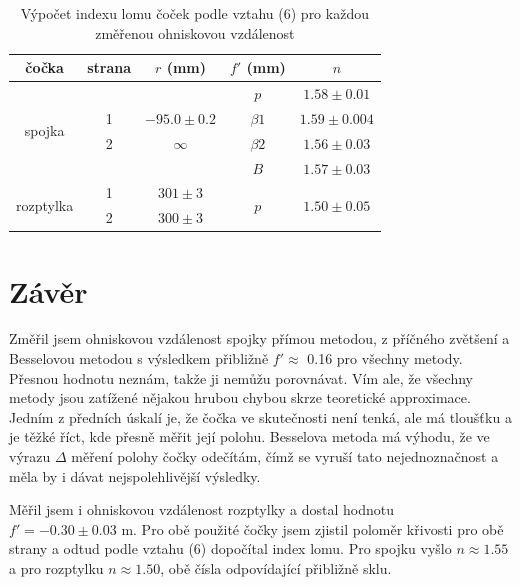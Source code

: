 \documentclass[a4paper,11pt]{article}
\begin{document}
\vspace{-10pt}

\begin{table}[htpb]
    \centering
    \begin{tabular}{c|cccc}
        \hline\hline
        čočka & strana & $ r $ (mm) & $ f' $ (mm) & $ n $ \\\hline
        \multirow{4}{*}{spojka} & &  & $ p $ & $ 1.58 \pm 0.01$ \\
         & 1 & $-95.0 \pm 0.2$ & $ \beta 1 $ & $ 1.59 \pm 0.004$ \\
         & 2 & $ \infty $ & $ \beta 2 $ &      $ 1.56 \pm 0.03$ \\
         & & & $ B $ &                   $ 1.57 \pm 0.03$ \\\hline
        \multirow{2}{*}{rozptylka} & 1 & $301 \pm 3$ & \multirow{2}{*}{$ p $} & \multirow{2}{*}{$1.50 \pm 0.05$} \\
         & 2 & $300 \pm 3$ & & \\
        \hline\hline
    \end{tabular}
    \caption{Výpočet indexu lomu čoček podle vztahu (6) pro každou změřenou ohniskovou vzdálenost}
\end{table}

\section{Závěr}

Změřil jsem ohniskovou vzdálenost spojky přímou metodou, z příčného zvětšení a Besselovou metodou s výsledkem přibližně $ f' \approx $ 0.16 pro všechny metody. Přesnou hodnotu neznám, takže ji nemůžu porovnávat. Vím ale, že všechny metody jsou zatížené nějakou hrubou chybou skrze teoretické approximace. Jedním z předních úskalí je, že čočka ve skutečnosti není tenká, ale má tloušťku a je těžké říct, kde přesně měřit její polohu. Besselova metoda má výhodu, že ve výrazu $ \Delta $ měření polohy čočky odečítám, čímž se vyruší tato nejednoznačnost a měla by i dávat nejspolehlivější výsledky.

Měřil jsem i ohniskovou vzdálenost rozptylky a dostal hodnotu $ f' = -0.30 \pm 0.03  \text{ m}$. Pro obě použité čočky jsem zjistil poloměr křivosti pro obě strany a odtud podle vztahu (6) dopočítal index lomu. Pro spojku vyšlo $ n \approx 1.55 $ a pro rozptylku $ n \approx 1.50 $, obě čísla odpovídající přibližně sklu.
\end{document}
